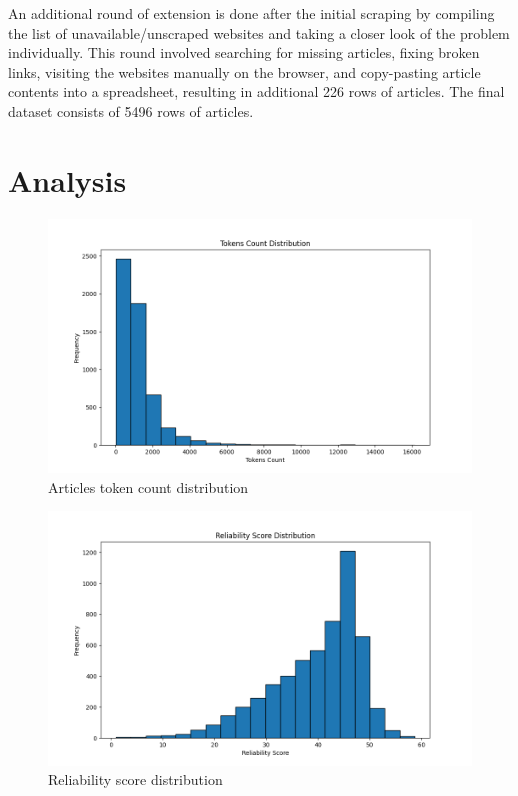 An additional round of extension is done after the initial scraping by compiling the list of unavailable/unscraped websites and taking a closer look of the problem individually. This round involved searching for missing articles, fixing broken links, visiting the websites manually on the browser, and copy-pasting article contents into a spreadsheet, resulting in additional 226 rows of articles. The final dataset consists of 5496 rows of articles.

\section{Analysis}

\begin{figure}[htbp]
    \centering
    \includegraphics[width=0.9\linewidth]{figures/tokens_count_vx_hist.png}
    \caption{Articles token count distribution}
    \label{fig:tokens_hist}
\end{figure}

\begin{figure}[htbp]
    \centering
    \includegraphics[width=0.9\linewidth]{figures/reliability_score_hist.png}
    \caption{Reliability score distribution}
    \label{fig:reliability_score_hist}
\end{figure}

